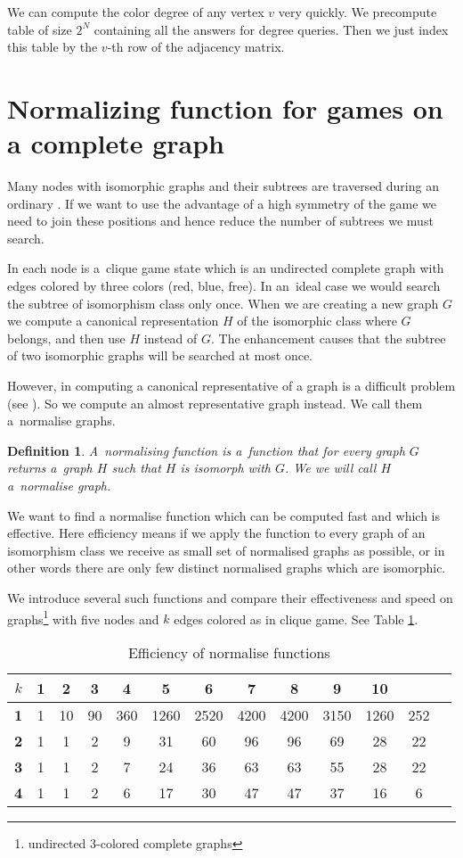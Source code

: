We can compute the color degree of any vertex $v$ very quickly. We precompute table of size
$2^N$ containing all the answers for degree queries. Then we just index this table by
the $v$-th row of the adjacency matrix. 

\section{Normalizing function for games on a complete graph} \label{norm} 

Many nodes with isomorphic graphs and their subtrees are traversed during an ordinary
. If we want to use the advantage of a high symmetry of the
game we need to join these positions and hence reduce the  number of subtrees we must
search.

In each node is a~clique game state which is an undirected complete graph with
edges colored by three colors (red, blue, free).
In an~ideal case we would search the subtree of isomorphism class
only once. When we are creating a new graph $G$ we compute a canonical
representation $H$ of the isomorphic class where $G$ belongs, and then use $H$ instead
of $G$. The enhancement  causes that the
subtree of two isomorphic graphs will be searched at most once.

However, in computing a canonical representative of a graph is a difficult
problem (see \cite{canonical}). So we compute an almost representative graph
instead. We call them a~normalise graphs.

\newtheorem*{norm}{Definition}	
\begin{norm}
{\sl A~normalising function} is a~function that for
every graph $G$ returns a~graph $H$ such that $H$ is isomorph with $G$. We we will call
$H$ a~{\sl normalise graph}.
\end{norm}

We want to find a normalise function which can be computed fast and which is
effective. Here efficiency means if we apply the function to every graph of an
isomorphism class we receive as small set of normalised graphs as possible, or
in other words there are only few distinct normalised graphs which are
isomorphic.

We introduce several such functions and compare their effectiveness and speed
on graphs\footnote{undirected 3-colored complete graphs} with five nodes and
$k$ edges colored as in clique game. See Table \ref{statsNorm}. 

\begin{table}
\centering
\begin{tabular}{c|c|c|c|c|c|c|c|c|c|c|c|c}
$k$&1&2&3&4&5&6&7&8&9&10\\
\hline
\textbf{1}&1&10&90&360&1260&2520&4200&4200&3150&1260&252\\
\textbf{2}&1&1&2&9&31&60&96&96&69&28&22\\
\textbf{3}&1&1&2&7&24&36&63&63&55&28&22\\
\textbf{4}&1&1&2&6&17&30&47&47&37&16&6\\
\end{tabular}
\caption{Efficiency of normalise functions}
\label{statsNorm}
\end{table}

